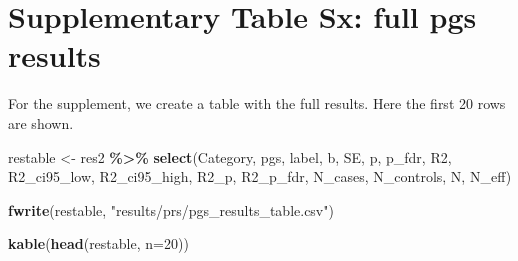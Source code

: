 \documentclass[
]{article}
\newenvironment{Shaded}{\begin{snugshade}}{\end{snugshade}}
\newcommand{\AttributeTok}[1]{\textcolor[rgb]{0.13,0.29,0.53}{#1}}
\newcommand{\DecValTok}[1]{\textcolor[rgb]{0.00,0.00,0.81}{#1}}
\newcommand{\FunctionTok}[1]{\textcolor[rgb]{0.13,0.29,0.53}{\textbf{#1}}}
\newcommand{\NormalTok}[1]{#1}
\newcommand{\OtherTok}[1]{\textcolor[rgb]{0.56,0.35,0.01}{#1}}
\newcommand{\SpecialCharTok}[1]{\textcolor[rgb]{0.81,0.36,0.00}{\textbf{#1}}}
\newcommand{\StringTok}[1]{\textcolor[rgb]{0.31,0.60,0.02}{#1}}
\begin{document}
\hypertarget{supplementary-table-sx-full-pgs-results}{%
\section{Supplementary Table Sx: full pgs
results}\label{supplementary-table-sx-full-pgs-results}}

For the supplement, we create a table with the full results. Here the
first 20 rows are shown.

\begin{Shaded}
\begin{Highlighting}[]
\NormalTok{restable }\OtherTok{\textless{}{-}}\NormalTok{ res2 }\SpecialCharTok{\%\textgreater{}\%} 
  \FunctionTok{select}\NormalTok{(Category, pgs, label, b, SE, p, p\_fdr, R2, R2\_ci95\_low, R2\_ci95\_high, R2\_p, R2\_p\_fdr, N\_cases, N\_controls, N, N\_eff)}

\FunctionTok{fwrite}\NormalTok{(restable, }\StringTok{"results/prs/pgs\_results\_table.csv"}\NormalTok{)}

\FunctionTok{kable}\NormalTok{(}\FunctionTok{head}\NormalTok{(restable, }\AttributeTok{n=}\DecValTok{20}\NormalTok{))}
\end{Highlighting}
\end{Shaded}
\end{document}
